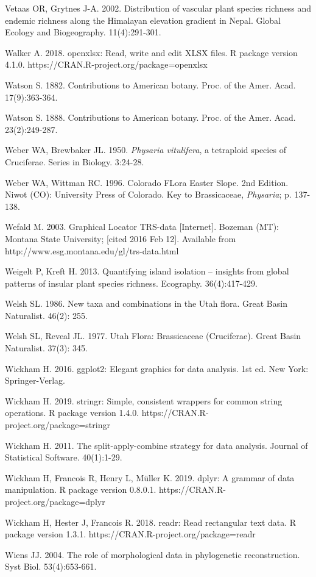 Vetaas OR, Grytnes J-A. 2002. Distribution of vascular plant species richness and endemic richness along the Himalayan elevation gradient in Nepal. Global Ecology and Biogeography. 11(4):291-301.

Walker A. 2018. openxlsx: Read, write and edit XLSX files. R package version 4.1.0. https://CRAN.R-project.org/package=openxlsx
  
Watson S. 1882. Contributions to American botany. Proc. of the Amer. Acad. 17(9):363-364.

Watson S. 1888. Contributions to American botany. Proc. of the Amer. Acad. 23(2):249-287.

Weber WA, Brewbaker JL. 1950. \textit{Physaria vitulifera}, a tetraploid species of Cruciferae. Series in Biology. 3:24-28.

Weber WA, Wittman RC. 1996. Colorado FLora Easter Slope. 2nd Edition. Niwot (CO): University Press of Colorado. Key to Brassicaceae, \textit{Physaria}; p. 137-138.

Wefald M. 2003. Graphical Locator TRS-data [Internet]. Bozeman (MT): Montana State University; [cited 2016 Feb 12]. Available from http://www.esg.montana.edu/gl/trs-data.html

Weigelt P, Kreft H. 2013. Quantifying island isolation – insights from global patterns of insular plant species richness. Ecography. 36(4):417-429.

Welsh SL. 1986. New taxa and combinations in the Utah flora. Great Basin Naturalist. 46(2): 255.

Welsh SL, Reveal JL. 1977. Utah Flora: Brassicaceae (Cruciferae). Great Basin Naturalist. 37(3): 345.

Wickham H. 2016. ggplot2: Elegant graphics for data analysis. 1st ed. New York: Springer-Verlag.

Wickham H. 2019. stringr: Simple, consistent wrappers for common string operations. R package version 1.4.0. https://CRAN.R-project.org/package=stringr

Wickham H. 2011. The split-apply-combine strategy for data analysis. Journal of Statistical Software. 40(1):1-29.

Wickham H, Francois R, Henry L, Müller K. 2019. dplyr: A grammar of data manipulation. R package version 0.8.0.1. https://CRAN.R-project.org/package=dplyr

Wickham H, Hester J, Francois R. 2018. readr: Read rectangular text data. R package version 1.3.1. https://CRAN.R-project.org/package=readr

Wiens JJ. 2004. The role of morphological data in phylogenetic reconstruction. Syst Biol. 53(4):653-661.

